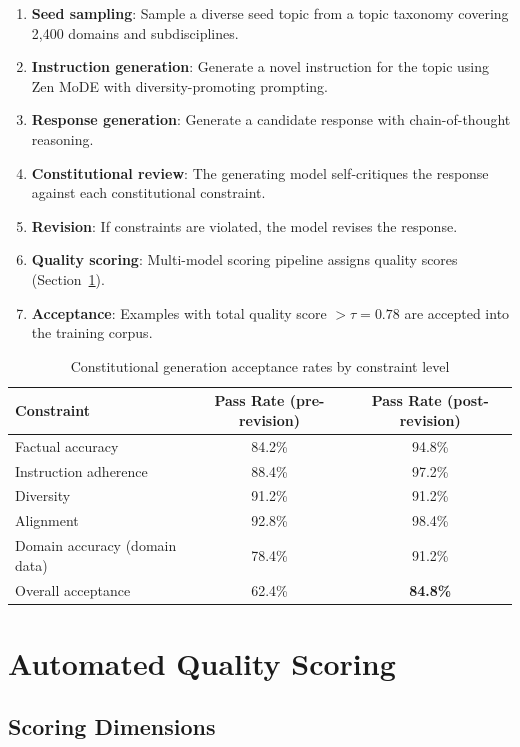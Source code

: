 \documentclass[11pt,a4paper]{article}
\begin{document}
\begin{enumerate}
  \item \textbf{Seed sampling}: Sample a diverse seed topic from a topic taxonomy covering 2,400 domains and subdisciplines.
  \item \textbf{Instruction generation}: Generate a novel instruction for the topic using Zen MoDE with diversity-promoting prompting.
  \item \textbf{Response generation}: Generate a candidate response with chain-of-thought reasoning.
  \item \textbf{Constitutional review}: The generating model self-critiques the response against each constitutional constraint.
  \item \textbf{Revision}: If constraints are violated, the model revises the response.
  \item \textbf{Quality scoring}: Multi-model scoring pipeline assigns quality scores (Section~\ref{sec:scoring}).
  \item \textbf{Acceptance}: Examples with total quality score $> \tau = 0.78$ are accepted into the training corpus.
\end{enumerate}

\begin{table}[H]
\centering
\caption{Constitutional generation acceptance rates by constraint level}
\label{tab:acceptance}
\begin{tabular}{lcc}
\toprule
Constraint & Pass Rate (pre-revision) & Pass Rate (post-revision) \\
\midrule
Factual accuracy & 84.2\% & 94.8\% \\
Instruction adherence & 88.4\% & 97.2\% \\
Diversity & 91.2\% & 91.2\% \\
Alignment & 92.8\% & 98.4\% \\
Domain accuracy (domain data) & 78.4\% & 91.2\% \\
\midrule
Overall acceptance & 62.4\% & \textbf{84.8\%} \\
\bottomrule
\end{tabular}
\end{table}

\section{Automated Quality Scoring}
\label{sec:scoring}

\subsection{Scoring Dimensions}
\end{document}
